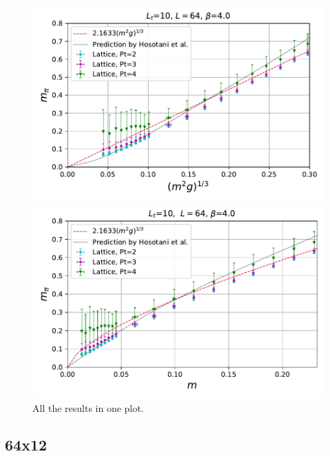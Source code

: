 \documentclass[11pt]{article}
\begin{document}
\begin{figure}[H]
\centering
\includegraphics[width=0.7 \textwidth]{Images/Mpi64x10FiniteTAllPt.pdf}

\includegraphics[width=0.7 \textwidth]{Images/MpivsM64x10FiniteTAllPt.pdf}

\caption{All the results in one plot.}
\end{figure}



\subsection*{64x12}
\end{document}
